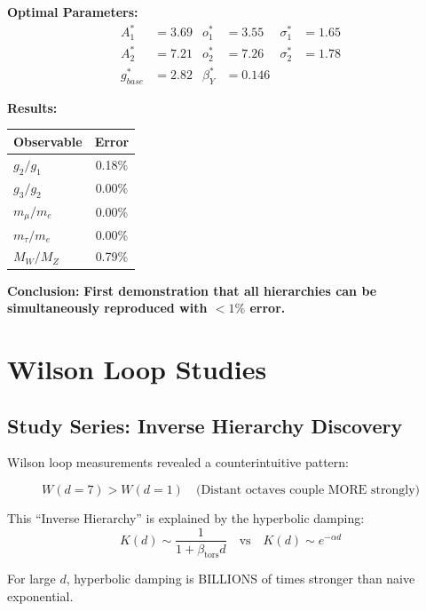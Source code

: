 \documentclass[11pt, a4paper]{article}
\theoremstyle{remark}
\newcommand{\betators}{\beta_{\text{tors}}}
\begin{document}
\textbf{Optimal Parameters:}
\begin{align}
A_1^* &= 3.69 & o_1^* &= 3.55 & \sigma_1^* &= 1.65 \\
A_2^* &= 7.21 & o_2^* &= 7.26 & \sigma_2^* &= 1.78 \\
g_{base}^* &= 2.82 & \beta_Y^* &= 0.146 &
\end{align}

\textbf{Results:}
\begin{table}[H]
\centering
\begin{tabular}{|l|c|}
\hline
\textbf{Observable} & \textbf{Error} \\
\hline
$g_2/g_1$ & 0.18\% \\
$g_3/g_2$ & 0.00\% \\
$m_\mu/m_e$ & 0.00\% \\
$m_\tau/m_e$ & 0.00\% \\
$M_W/M_Z$ & 0.79\% \\
\hline
\end{tabular}
\end{table}

\textbf{Conclusion:} \textbf{First demonstration that all hierarchies can be simultaneously reproduced with $<1\%$ error.}

\section{Wilson Loop Studies}

\subsection{Study Series: Inverse Hierarchy Discovery}

Wilson loop measurements revealed a counterintuitive pattern:

\begin{equation}
W(d=7) > W(d=1) \quad \text{(Distant octaves couple MORE strongly)}
\end{equation}

This ``Inverse Hierarchy'' is explained by the hyperbolic damping:
\begin{equation}
K(d) \sim \frac{1}{1 + \betators d} \quad \text{vs} \quad K(d) \sim e^{-\alpha d}
\end{equation}

For large $d$, hyperbolic damping is BILLIONS of times stronger than naive exponential.

\newpage
\end{document}
